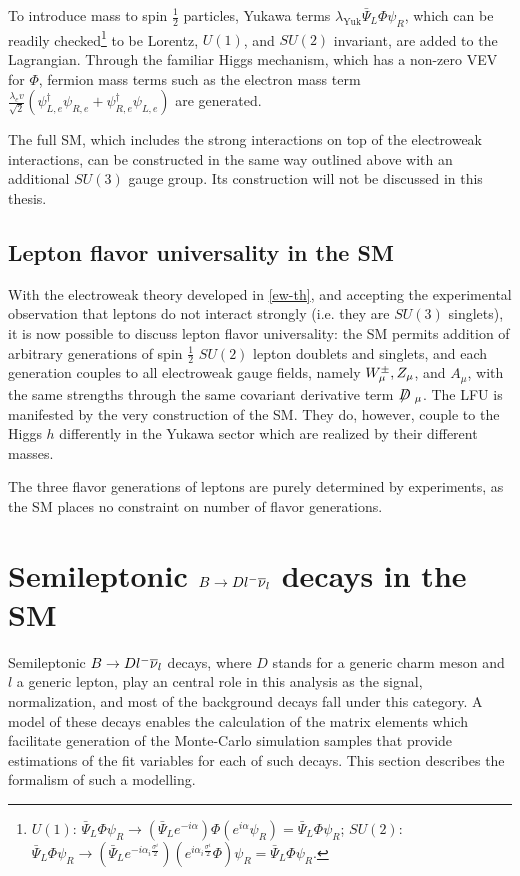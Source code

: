 To introduce mass to spin $\frac{1}{2}$ particles, Yukawa terms
$\lambda_\text{Yuk} \bar{\Psi}_L \Phi \psi_R$,
which can be readily checked\footnote{
    $U(1)$:
    $\bar{\Psi}_L \Phi \psi_R \rightarrow
    (\bar{\Psi}_L e^{-i \alpha}) \Phi (e^{i \alpha} \psi_R)
    = \bar{\Psi}_L \Phi \psi_R$;
    $SU(2)$:
    $\bar{\Psi}_L \Phi \psi_R \rightarrow
    (\bar{\Psi}_L e^{-i \alpha_i \frac{\sigma^i}{2}}) (e^{i \alpha_i \frac{\sigma^i}{2}} \Phi) \psi_R
    = \bar{\Psi}_L \Phi \psi_R$.
} to be Lorentz, $U(1)$, and $SU(2)$ invariant, are added to the Lagrangian.
Through the familiar Higgs mechanism, which has a non-zero VEV for $\Phi$,
fermion mass terms such as the electron mass term
$\frac{\lambda_e v}{\sqrt{2}}({\psi^\dagger_{L,e} \psi_{R,e} + \psi^\dagger_{R,e}\psi_{L,e}})$
are generated.

The full SM,
which includes the strong interactions on top of the electroweak interactions,
can be constructed in the same way outlined above with an additional $SU(3)$
gauge group.
Its construction will not be discussed in this thesis.


\subsection{Lepton flavor universality in the SM}
\label{ref:theory:lfu}

With the electroweak theory developed in \cref{ew-th},
and accepting the experimental observation that leptons do not interact strongly
(i.e. they are $SU(3)$ singlets),
it is now possible to discuss lepton flavor universality:
the SM permits addition of arbitrary generations of spin $\frac{1}{2}$
$SU(2)$ lepton doublets and singlets,
and each generation couples to all electroweak gauge fields,
namely ${W}^\pm_\mu, Z_\mu$, and $A_\mu$,
with the same strengths through the same covariant derivative term
$\fsl{D}_\mu$.
The LFU is manifested by the very construction of the SM.
They do, however, couple to the Higgs $h$ differently in the Yukawa sector which
are realized by their different masses.

The three flavor generations of leptons are purely determined by experiments,
as the SM places no constraint on number of flavor generations.


\section{Semileptonic $B \rightarrow D {l^-}{{\overline{\nu}}_l}$ decays in the SM}

Semileptonic $B \rightarrow D {l^-}{{\overline{\nu}}_l}$ decays,
where $D$ stands for a generic charm meson and $l$ a generic lepton,
play an central role in this analysis as the signal, normalization,
and most of the background decays fall under this category.
A model of these decays enables the calculation of the matrix elements which
facilitate generation of the Monte-Carlo simulation samples that provide
estimations of the fit variables for each of such decays.
This section describes the formalism of such a modelling.

